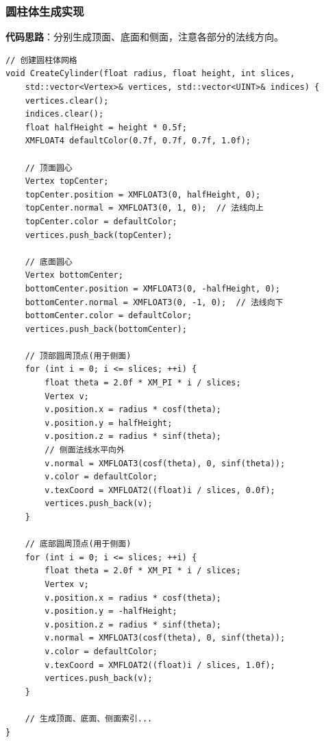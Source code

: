 \documentclass[12pt,a4paper]{article}
\begin{document}
\begin{tcolorbox}
\subsubsection{圆柱体生成实现}

\textbf{代码思路}：分别生成顶面、底面和侧面，注意各部分的法线方向。

\begin{lstlisting}[caption={圆柱体生成函数}]
// 创建圆柱体网格
void CreateCylinder(float radius, float height, int slices,
    std::vector<Vertex>& vertices, std::vector<UINT>& indices) {
    vertices.clear();
    indices.clear();
    float halfHeight = height * 0.5f;
    XMFLOAT4 defaultColor(0.7f, 0.7f, 0.7f, 1.0f);
    
    // 顶面圆心
    Vertex topCenter;
    topCenter.position = XMFLOAT3(0, halfHeight, 0);
    topCenter.normal = XMFLOAT3(0, 1, 0);  // 法线向上
    topCenter.color = defaultColor;
    vertices.push_back(topCenter);
    
    // 底面圆心
    Vertex bottomCenter;
    bottomCenter.position = XMFLOAT3(0, -halfHeight, 0);
    bottomCenter.normal = XMFLOAT3(0, -1, 0);  // 法线向下
    bottomCenter.color = defaultColor;
    vertices.push_back(bottomCenter);
    
    // 顶部圆周顶点(用于侧面)
    for (int i = 0; i <= slices; ++i) {
        float theta = 2.0f * XM_PI * i / slices;
        Vertex v;
        v.position.x = radius * cosf(theta);
        v.position.y = halfHeight;
        v.position.z = radius * sinf(theta);
        // 侧面法线水平向外
        v.normal = XMFLOAT3(cosf(theta), 0, sinf(theta));
        v.color = defaultColor;
        v.texCoord = XMFLOAT2((float)i / slices, 0.0f);
        vertices.push_back(v);
    }
    
    // 底部圆周顶点(用于侧面)
    for (int i = 0; i <= slices; ++i) {
        float theta = 2.0f * XM_PI * i / slices;
        Vertex v;
        v.position.x = radius * cosf(theta);
        v.position.y = -halfHeight;
        v.position.z = radius * sinf(theta);
        v.normal = XMFLOAT3(cosf(theta), 0, sinf(theta));
        v.color = defaultColor;
        v.texCoord = XMFLOAT2((float)i / slices, 1.0f);
        vertices.push_back(v);
    }
    
    // 生成顶面、底面、侧面索引...
}
\end{lstlisting}
\end{tcolorbox}
\end{document}
